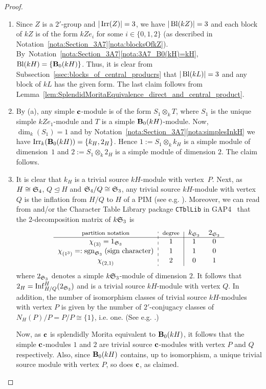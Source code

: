 \begin{proof}
\begin{enumerate}[label={\rm(\alph*)}]
    \item Since $Z$ is a $2'$-group and  $|\operatorname{Irr}(Z)|=3$,  we have  $|\operatorname{Bl}(kZ)|=3$ and each block of $kZ$ is of the form $kZe_i$ for some $i\in\{0,1,2\}$ (as described in Notation~\ref{nota:Section_3A7}\ref{nota:blocksOfkZ}). By~Notation~\ref{nota:Section_3A7}\ref{nota:3A7_B0(kH)=kH}, $\operatorname{Bl}(kH)=\{{\mathbf{B}}_0(kH)\}$. Thus, it is clear from Subsection~\ref{ssec:blocks_of_central_producrs} that $|\operatorname{Bl}(kL)|=3$ and any block of $kL$ has the given form. The last claim follows from Lemma~\ref{lem:SplendidMoritaEquivalence_direct_and_central_product}.
    \item By (a), any simple ${\mathbf{c}}$-module is of the form $S_1\otimes_kT$, where $S_1$ is the unique simple $kZe_1$-module and $T$ is a simple ${\mathbf{B}}_0(kH)$-module. Now, $\dim_k(S_1)=1$ and by Notation~\ref{nota:Section_3A7}\ref{nota:simplesInkH} we have $\operatorname{Irr}_k({\mathbf{B}}_0(kH))=\{k_H,2_H\}$. Hence $1:=S_1\otimes_k k_H$ is a simple module of dimension~$1$ and $2:=S_1\otimes_k 2_H$ is a simple module of dimension $2$. The claim follows.
    \item It is clear that $k_H$ is a trivial source $kH$-module with vertex~$P$. 
    Next, as $H\cong {\mathfrak{S}}_4$, $Q\unlhd H$ and   ${\mathfrak{S}}_4/Q\cong {\mathfrak{S}}_3$, any trivial source $kH$-module with vertex $Q$ is the inflation from $H/Q$ to $H$ of a PIM (see e.g. \cite[Theorem~4.6(c)]{LasSurvey}). Moreover, we can read from \cite[Appendix I.E]{JamesKerberBook} and/or the Character Table Library package \verb|CTblLib| in GAP4~\cite{GAP} that  the $2$-decomposition matrix of $k{\mathfrak{S}}_3$ is 
    \[
        \begin{tabular}{c:c|cc}{\footnotesize{partition notation}} &  {\footnotesize{degree}} & $k_{\fS_3}$ & $2_{\fS_3}$\\
            \hline  
            $\chi^{}_{(3)}=1_{\fS_3}$  & $1$   & $1$ & $0$\\
            $\chi^{}_{(1^3)}=: \mathrm{sgn}_{\fS_3}\text{\;(sign character)}$& $1$& $1$ & $0$\\
            $\chi^{}_{(2,1)}$& $2$ & $0$ & $1$\\
        \end{tabular}
    \]
    where $2_{{\mathfrak{S}}_3}$ denotes a simple $k{\mathfrak{S}}_3$-module of dimension $2$. 
    It follows that $2_H=\operatorname{Inf}_{H/Q}^{H}(2_{{\mathfrak{S}}_3})$ and is a trivial source $kH$-module with vertex $Q$. In addition, the number of isomorphism classes of trivial source $kH$-modules with vertex $P$ is given by the number of $2'$-conjugacy classes of  $N_H(P)/P=P/P\cong \{1\}$, i.e. one. (See e.g. \cite[Theorem~4.6(c)]{LasSurvey}.)
    \par
    Now, as ${\mathbf{c}}$ is splendidly Morita equivalent to ${\mathbf{B}}_0(kH)$, it follows that the simple ${\mathbf{c}}$-modules $1$ and $2$ are trivial source ${\mathbf{c}}$-modules with vertex $P$ and $Q$ respectively. Also, since ${\mathbf{B}}_0(kH)$  contains, up to isomorphism, a unique trivial source module with vertex $P$, so does ${\mathbf{c}}$, as claimed.
\end{enumerate}    
\end{proof}

